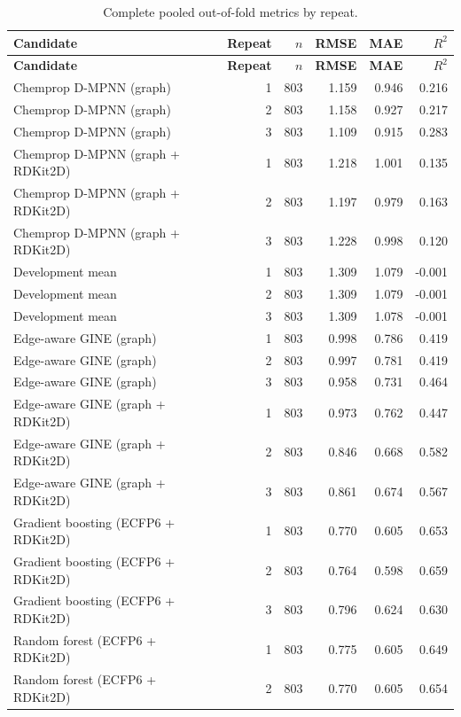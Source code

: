 \begingroup
\small
\begin{longtable}{L{0.40\textwidth}rrrrr}
\caption{Complete pooled out-of-fold metrics by repeat.}\label{tab:repeat-metrics}\\
\toprule
\textbf{Candidate} & \textbf{Repeat} & \textbf{$n$} & \textbf{RMSE} & \textbf{MAE} & \textbf{$R^2$} \\
\midrule
\endfirsthead
\toprule
\textbf{Candidate} & \textbf{Repeat} & \textbf{$n$} & \textbf{RMSE} & \textbf{MAE} & \textbf{$R^2$} \\
\midrule
\endhead
Chemprop D-MPNN (graph) & 1 & 803 & 1.159 & 0.946 & 0.216 \\
Chemprop D-MPNN (graph) & 2 & 803 & 1.158 & 0.927 & 0.217 \\
Chemprop D-MPNN (graph) & 3 & 803 & 1.109 & 0.915 & 0.283 \\
Chemprop D-MPNN (graph + RDKit2D) & 1 & 803 & 1.218 & 1.001 & 0.135 \\
Chemprop D-MPNN (graph + RDKit2D) & 2 & 803 & 1.197 & 0.979 & 0.163 \\
Chemprop D-MPNN (graph + RDKit2D) & 3 & 803 & 1.228 & 0.998 & 0.120 \\
Development mean & 1 & 803 & 1.309 & 1.079 & -0.001 \\
Development mean & 2 & 803 & 1.309 & 1.079 & -0.001 \\
Development mean & 3 & 803 & 1.309 & 1.078 & -0.001 \\
Edge-aware GINE (graph) & 1 & 803 & 0.998 & 0.786 & 0.419 \\
Edge-aware GINE (graph) & 2 & 803 & 0.997 & 0.781 & 0.419 \\
Edge-aware GINE (graph) & 3 & 803 & 0.958 & 0.731 & 0.464 \\
Edge-aware GINE (graph + RDKit2D) & 1 & 803 & 0.973 & 0.762 & 0.447 \\
Edge-aware GINE (graph + RDKit2D) & 2 & 803 & 0.846 & 0.668 & 0.582 \\
Edge-aware GINE (graph + RDKit2D) & 3 & 803 & 0.861 & 0.674 & 0.567 \\
Gradient boosting (ECFP6 + RDKit2D) & 1 & 803 & 0.770 & 0.605 & 0.653 \\
Gradient boosting (ECFP6 + RDKit2D) & 2 & 803 & 0.764 & 0.598 & 0.659 \\
Gradient boosting (ECFP6 + RDKit2D) & 3 & 803 & 0.796 & 0.624 & 0.630 \\
Random forest (ECFP6 + RDKit2D) & 1 & 803 & 0.775 & 0.605 & 0.649 \\
Random forest (ECFP6 + RDKit2D) & 2 & 803 & 0.770 & 0.605 & 0.654 \\

\end{longtable}
